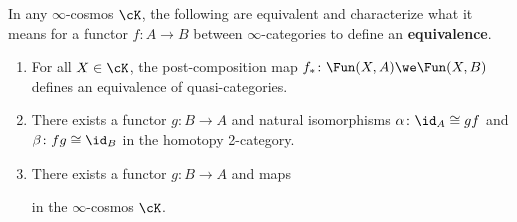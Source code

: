   \begin{theorem}\label{thm:equiv-are-equiv}
     In any $\infty$-cosmos $\cK$, the following are equivalent and characterize what it means for a functor $f \colon A \to B$ between $\infty$-categories to define an \textbf{equivalence}.
  \begin{enumerate}
  \item\label{itm:rep-equiv} For all $X \in \cK$, the post-composition map $f_* \colon \Fun(X,A) \we \Fun(X,B)$ defines an equivalence of quasi-categories.
  \item\label{itm:2cat-equiv} There exists a functor $g \colon B \to A$ and natural isomorphisms $\alpha \colon \id_A \cong gf$ and $\beta \colon fg \cong \id_B$ in the homotopy 2-category.
  \item\label{itm:htpy-equiv} There exists a functor $g \colon B \to A$ and maps
  \begin{center}
  \end{center} in the $\infty$-cosmos $\cK$.
  \end{enumerate}
  \end{theorem}

